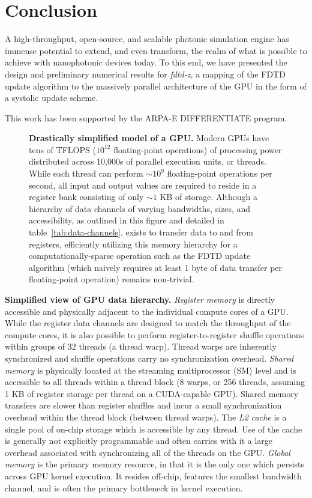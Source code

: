 \documentclass[12pt]{article}
\newcommand{\fdtdz}{\mbox{\emph{fdtd-z}}}  %
\newcommand{\myfig}[3]{
  \begin{figure}[bp]
		\begin{center}
			
      \caption{\textbf{#2}#3\label{fig:#1}}
		\end{center}
	\end{figure}
}
\newcommand{\mytab}[3]{
  \begin{table}[bp]
		\begin{center}
			
      \caption{\textbf{#2}#3\label{tab:#1}}
		\end{center}
	\end{table}
}
\begin{document}
\section{Conclusion}
A high-throughput, open-source, and scalable photonic simulation engine 
  has immense potential to extend, and even transform,
  the realm of what is possible to achieve with nanophotonic devices today.
To this end, 
  we have presented the design and preliminary numerical results for {\fdtdz},
  a mapping of the FDTD update algorithm
  to the massively parallel architecture of the GPU
  in the form of a systolic update scheme.

This work has been supported by the ARPA-E DIFFERENTIATE program.


\myfig{gpu-problem}{Drastically simplified model of a GPU.}{
  Modern GPUs have tens of TFLOPS ($10^{12}$ floating-point operations)
    of processing power distributed across 10,000s of parallel execution units,
    or threads.
  While each thread can perform
    $\sim 10^9$ floating-point operations per second,
    all input and output values are required
    to reside in a register bank consisting of only $\sim 1$ KB of storage.
  Although a hierarchy of data channels
    of varying bandwidths, sizes, and accessibility,
    as outlined in this figure and detailed in table~\ref{tab:data-channels},
    exists to transfer data to and from registers,
    efficiently utilizing this memory hierarchy 
    for a computationally-sparse operation such as the FDTD update algorithm
    (which naively requires at least 1 byte of data transfer
    per floating-point operation)
    remains non-trivial.
}

\mytab{data-channels}{Simplified view of GPU data hierarchy.}{
  \emph{Register memory} is directly accessible and physically adjacent to
    the individual compute cores of a GPU.
  While the register data channels are designed to match
    the throughput of the compute cores,
    it is also possible to perform register-to-register shuffle operations 
    within groups of 32 threads (a thread warp).
  Thread warps are inherently synchronized
    and shuffle operations carry no synchronization overhead.
  \emph{Shared memory} is physically located
    at the streaming multiprocessor (SM) level
    and is accessible to all threads within a thread block
    (8 warps, or 256 threads, assuming 1 KB of register storage per thread
    on a CUDA-capable GPU).
  Shared memory transfers are slower than register shuffles
    and incur a small synchronization overhead within the thread block
    (between thread warps).
  The \emph{L2 cache} is a single pool of on-chip storage
    which is accessible by any thread.
  Use of the cache is generally not explicitly programmable
    and often carries with it a large overhead associated with
    synchronizing all of the threads on the GPU.
  \emph{Global memory} is the primary memory resource,
    in that it is the only one which persists across GPU kernel execution.
  It resides off-chip, features the smallest bandwidth channel,
    and is often the primary bottleneck in kernel execution.
}
\end{document}
